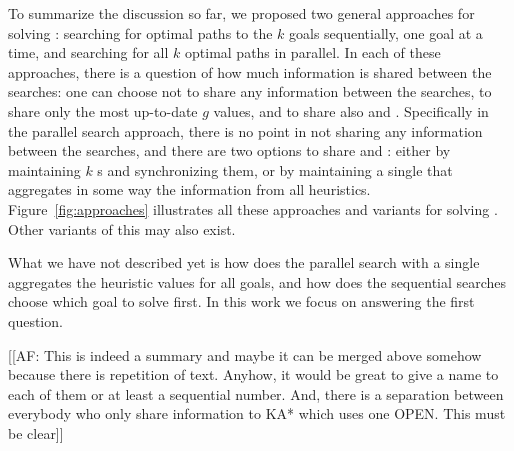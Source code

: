 To summarize the discussion so far, we proposed two general approaches for solving \kgs: searching for optimal paths to the $k$ goals sequentially, one goal at a time, and searching for all $k$ optimal paths in parallel.
In each of these approaches, there is a question of how much information is shared between the searches: one can choose not to share any information between the searches, to share only the most up-to-date $g$ values, and to share also \open and \closed.
Specifically in the parallel search approach, there is no point in not sharing any information between the searches, and there are two options to share \open and \closed: either by maintaining $k$ \open{}s and synchronizing them, or by maintaining a single \open that aggregates in some way the information from all heuristics.
Figure~\ref{fig:approaches} illustrates all these approaches and variants for solving \kgs.
Other variants of this may also exist.

What we have not described yet is how does the parallel search with a single \open aggregates the heuristic values for all goals, and how does the sequential searches choose which goal to solve first. In this work we focus on answering the first question.

[[AF: This is indeed a summary and maybe it can be merged above somehow because there is repetition of text. Anyhow, it would be great to give a name to each of them or at least a sequential number.  And, there is a separation between everybody who only share information to KA* which uses one OPEN. This must be clear]]